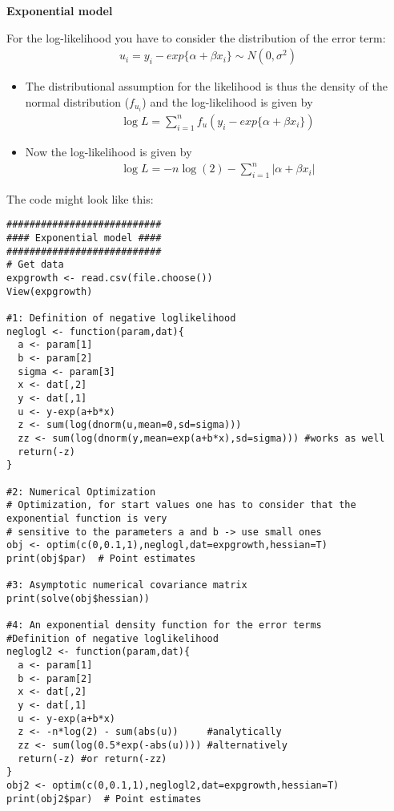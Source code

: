 \begin{Solution}{12.4}
\textbf{Exponential model}

For the log-likelihood you have to consider the distribution of the error
term:
\begin{align*}
  u_i = y_i - exp\{\alpha + \beta x_i\} \sim N(0,\sigma^2)
\end{align*}
\begin{itemize}
\item[1)/2)/3)] The distributional assumption for the likelihood is thus
    the density of the normal distribution ($f_{u_i}$) and the
    log-likelihood is given by
\begin{align*}
  \log L = \sum_{i=1}^n f_u(y_i - exp\{\alpha + \beta x_i\})
\end{align*}
\item[4)] Now the log-likelihood is given by
\begin{align*}
  \log L = -n \log(2) - \sum_{i=1}^n |\alpha + \beta x_i|
\end{align*}
\end{itemize}
The code might look like this:
\begin{verbatim}
###########################
#### Exponential model ####
###########################
# Get data
expgrowth <- read.csv(file.choose())
View(expgrowth)

#1: Definition of negative loglikelihood
neglogl <- function(param,dat){
  a <- param[1]
  b <- param[2]
  sigma <- param[3]
  x <- dat[,2]
  y <- dat[,1]
  u <- y-exp(a+b*x)
  z <- sum(log(dnorm(u,mean=0,sd=sigma)))
  zz <- sum(log(dnorm(y,mean=exp(a+b*x),sd=sigma))) #works as well
  return(-z)
}

#2: Numerical Optimization
# Optimization, for start values one has to consider that the exponential function is very
# sensitive to the parameters a and b -> use small ones
obj <- optim(c(0,0.1,1),neglogl,dat=expgrowth,hessian=T)
print(obj$par)  # Point estimates

#3: Asymptotic numerical covariance matrix
print(solve(obj$hessian))

#4: An exponential density function for the error terms
#Definition of negative loglikelihood
neglogl2 <- function(param,dat){
  a <- param[1]
  b <- param[2]
  x <- dat[,2]
  y <- dat[,1]
  u <- y-exp(a+b*x)
  z <- -n*log(2) - sum(abs(u))     #analytically
  zz <- sum(log(0.5*exp(-abs(u)))) #alternatively
  return(-z) #or return(-zz)
}
obj2 <- optim(c(0,0.1,1),neglogl2,dat=expgrowth,hessian=T)
print(obj2$par)  # Point estimates
\end{verbatim}
\end{Solution}
